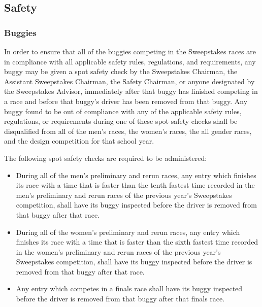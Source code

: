 \subsection{Safety}

\subsubsection{Buggies}

	In order to ensure that all of the buggies competing in the Sweepstakes races are in compliance with all applicable safety rules, regulations, and requirements, any buggy may be given a spot safety check by the Sweepstakes Chairman, the Assistant Sweepstakes Chairman, the Safety Chairman, or anyone designated by the Sweepstakes Advisor, immediately after that buggy has finished competing in a race and before that buggy's driver has been removed from that buggy. Any buggy found to be out of compliance with any of the applicable safety rules, regulations, or requirements during one of these spot safety checks shall be disqualified from all of the men's races, the women's races, the all gender races, and the design competition for that school year.
	\newline

	\noindent The following spot safety checks are required to be administered:

	\begin{itemize}

		\item
		During all of the men's preliminary and rerun races, any entry which finishes its race with a time that is faster than the tenth fastest time recorded in the men's preliminary and rerun races of the previous year's Sweepstakes competition, shall have its buggy inspected before the driver is removed from that buggy after that race.

		\item
		During all of the women's preliminary and rerun races, any entry which finishes its race with a time that is faster than the sixth fastest time recorded in the women's preliminary and rerun races of the previous year's Sweepstakes competition, shall have its buggy inspected before the driver is removed from that buggy after that race.

		\item
		Any entry which competes in a finals race shall have its buggy inspected before the driver is removed from that buggy after that finals race.

	\end{itemize}

